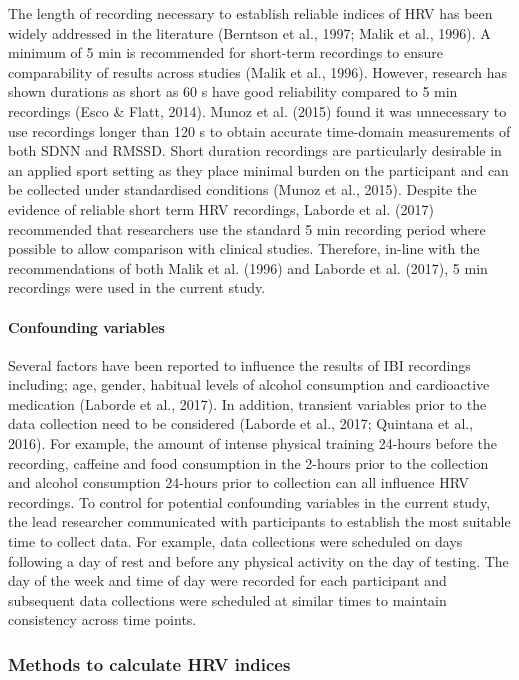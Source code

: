 \documentclass[man,floatsintext]{apa6}
\let\oldparagraph\paragraph
\renewcommand{\paragraph}[1]{\oldparagraph{#1}\mbox{}}
\begin{document}
The length of recording necessary to establish reliable indices of HRV has been widely addressed in the literature (Berntson et al., 1997; Malik et al., 1996).
A minimum of 5 min is recommended for short-term recordings to ensure comparability of results across studies (Malik et al., 1996).
However, research has shown durations as short as 60 s have good reliability compared to 5 min recordings (Esco \& Flatt, 2014).
Munoz et al. (2015) found it was unnecessary to use recordings longer than 120 s to obtain accurate time-domain measurements of both SDNN and RMSSD.
Short duration recordings are particularly desirable in an applied sport setting as they place minimal burden on the participant and can be collected under standardised conditions (Munoz et al., 2015).
Despite the evidence of reliable short term HRV recordings, Laborde et al. (2017) recommended that researchers use the standard 5 min recording period where possible to allow comparison with clinical studies.
Therefore, in-line with the recommendations of both Malik et al. (1996) and Laborde et al. (2017), 5 min recordings were used in the current study.

\hypertarget{confounding-variables}{%
\paragraph{Confounding variables}\label{confounding-variables}}

Several factors have been reported to influence the results of IBI recordings including; age, gender, habitual levels of alcohol consumption and cardioactive medication (Laborde et al., 2017).
In addition, transient variables prior to the data collection need to be considered (Laborde et al., 2017; Quintana et al., 2016).
For example, the amount of intense physical training 24-hours before the recording, caffeine and food consumption in the 2-hours prior to the collection and alcohol consumption 24-hours prior to collection can all influence HRV recordings.
To control for potential confounding variables in the current study, the lead researcher communicated with participants to establish the most suitable time to collect data.
For example, data collections were scheduled on days following a day of rest and before any physical activity on the day of testing.
The day of the week and time of day were recorded for each participant and subsequent data collections were scheduled at similar times to maintain consistency across time points.

\hypertarget{methods-to-calculate-hrv-indices}{%
\subsubsection{Methods to calculate HRV indices}\label{methods-to-calculate-hrv-indices}}
\end{document}
